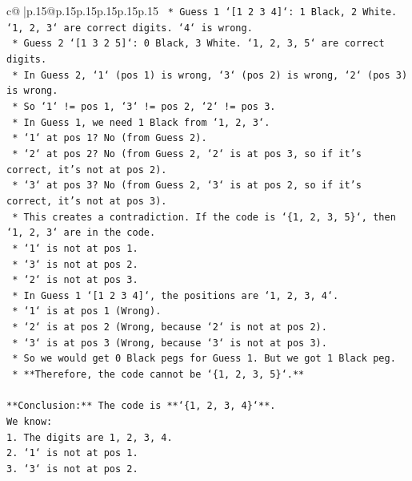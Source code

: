 \documentclass{article}
\begin{document}
{\begin{supertabular}{c@{$\;$}|p{.15\linewidth}@{}p{.15\linewidth}p{.15\linewidth}p{.15\linewidth}p{.15\linewidth}p{.15\linewidth}}
{{{\texttt{        *   Guess 1 `{[}1 2 3 4{]}`: 1 Black, 2 White. `1, 2, 3` are correct digits. `4` is wrong.} \\
\texttt{        *   Guess 2 `{[}1 3 2 5{]}`: 0 Black, 3 White. `1, 2, 3, 5` are correct digits.} \\
\texttt{        *   In Guess 2, `1` (pos 1) is wrong, `3` (pos 2) is wrong, `2` (pos 3) is wrong.} \\
\texttt{        *   So `1` != pos 1, `3` != pos 2, `2` != pos 3.} \\
\texttt{        *   In Guess 1, we need 1 Black from `1, 2, 3`.} \\
\texttt{            *   `1` at pos 1? No (from Guess 2).} \\
\texttt{            *   `2` at pos 2? No (from Guess 2, `2` is at pos 3, so if it's correct, it's not at pos 2).} \\
\texttt{            *   `3` at pos 3? No (from Guess 2, `3` is at pos 2, so if it's correct, it's not at pos 3).} \\
\texttt{        *   This creates a contradiction. If the code is `\{1, 2, 3, 5\}`, then `1, 2, 3` are in the code.} \\
\texttt{            *   `1` is not at pos 1.} \\
\texttt{            *   `3` is not at pos 2.} \\
\texttt{            *   `2` is not at pos 3.} \\
\texttt{            *   In Guess 1 `{[}1 2 3 4{]}`, the positions are `1, 2, 3, 4`.} \\
\texttt{            *   `1` is at pos 1 (Wrong).} \\
\texttt{            *   `2` is at pos 2 (Wrong, because `2` is not at pos 2).} \\
\texttt{            *   `3` is at pos 3 (Wrong, because `3` is not at pos 3).} \\
\texttt{            *   So we would get 0 Black pegs for Guess 1. But we got 1 Black peg.} \\
\texttt{        *   **Therefore, the code cannot be `\{1, 2, 3, 5\}`.**} \\
\\ 
\texttt{**Conclusion:** The code is **`\{1, 2, 3, 4\}`**.} \\
\texttt{We know:} \\
\texttt{1.  The digits are 1, 2, 3, 4.} \\
\texttt{2.  `1` is not at pos 1.} \\
\texttt{3.  `3` is not at pos 2.} \\
}}}
\end{supertabular}}
\end{document}
